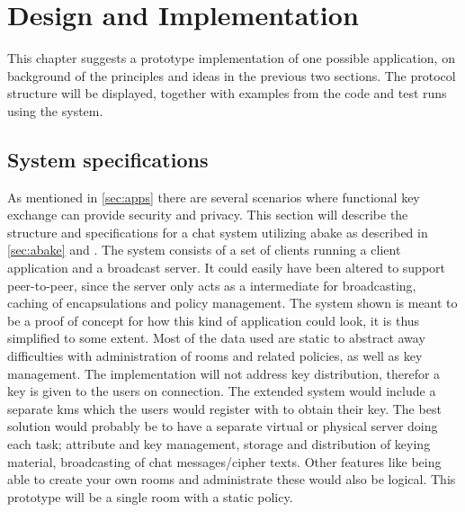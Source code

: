 \chapter{Design and Implementation}\label{chp:designimpl}
This chapter suggests a prototype implementation of one possible application, on background of the principles and ideas in the previous two sections. The protocol structure will be displayed, together with examples from the code and test runs using the system.

\section{System specifications}\label{sec:chat}
As mentioned in \ref{sec:apps} there are several scenarios where functional key exchange can provide security and privacy. This section will describe the structure and specifications for a chat system utilizing \gls{abake} as described in \ref{sec:abake} and \cite{DBLP:abake}. The system consists of a set of clients running a client application and a broadcast server. It could easily have been altered to support peer-to-peer, since the server only acts as a intermediate for broadcasting, caching of encapsulations and policy management. The system shown is meant to be a proof of concept for how this kind of application could look, it is thus simplified to some extent. Most of the data used are static to abstract away difficulties with administration of rooms and related policies, as well as key management. The implementation will not address key distribution, therefor a key is given to the users on connection. The extended system would include a separate \gls{kms} which the users would register with to obtain their key. The best solution would probably be to have a separate virtual or physical server doing each task; attribute and key management, storage and distribution of keying material, broadcasting of chat messages/cipher texts. Other features like being able to create your own rooms and administrate these would also be logical. This prototype will be a single room with a static policy.

